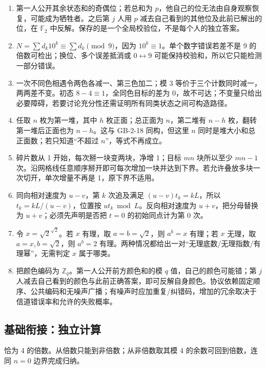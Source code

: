 \begin{enumerate}[leftmargin=*]
  \item 第一人公开其余状态和的奇偶位；若总和为 $p$，他自己的位无法由自身观察恢复，可能成为牺牲者。之后第 $j$ 人用 $p$ 减去自己看到的其他位及此前已解出的位，在 $\mathbb F_2$ 中反解。保存的是一个全局校验位，不是每个人的独立答案。
  \item $N=\sum d_k10^k\equiv\sum d_k\pmod9$，因为 $10^k\equiv1$。单个数字错误若差不是 9 的倍数可检出；换位、多个误差抵消或 $0\leftrightarrow9$ 可能保持校验和，所以它只能检测一部分错误。
  \item 一次不同色相遇令两色各减一、第三色加二；模 3 等价于三个计数同时减一，两两差不变。初态 $8-4\equiv1$，全同色目标的差为 0，故不可达；不变量只给出必要障碍，若要讨论充分性还需证明所有同类状态之间可构造路径。
  \item 任取 $n$ 枚为第一堆，其中 $h$ 枚正面；总正面为 $n$，第二堆有 $n-h$ 枚，翻转第一堆后正面也为 $n-h$。这与 GB-2-18 同构，但这里 $n$ 同时是堆大小和总正面数；若只知道“不超过 $n$”，等式不再成立。
  \item 碎片数从 1 开始，每次掰一块变两块，净增 1；目标 $mn$ 块所以至少 $mn-1$ 次。沿网格线任意顺序掰开即可每次增加一块并达到下界。若允许叠放多块一次切开，单次增量不再是 1，原下界不适用。
  \item 同向相对速度为 $u-v$，第 $k$ 次追及满足 $(u-v)t_k=kL$，所以 $t_k=kL/(u-v)$，位置按 $ut_k\bmod L$。反向相对速度为 $u+v$，把分母替换为 $u+v$；必须先声明是否把 $t=0$ 的初始同点计为第 0 次。
  \item 令 $x=\sqrt2^{\sqrt2}$。若 $x$ 有理，取 $a=b=\sqrt2$，则 $a^b=x$ 有理；若 $x$ 无理，取 $a=x,b=\sqrt2$，则 $a^b=2$ 有理。两种情况都给出一对“无理底数/无理指数/有理幂”，无需判定 $x$ 属于哪类。
  \item 把颜色编码为 $\mathbb Z_q$。第一人公开前方颜色和的模 $q$ 值，自己的颜色可能错；第 $j$ 人减去自己看到的颜色与此前正确答案，即可反解自身颜色。协议依赖固定顺序、公共编码和无噪声广播；有噪声时应加重复/纠错码，增加的冗余取决于信道错误率和允许的失败概率。
\end{enumerate}

\subsection*{基础衔接：独立计算}
恰为 4 的倍数。从倍数只能到非倍数；从非倍数取其模 4 的余数可回到倍数，连同 $n=0$ 边界完成归纳。
